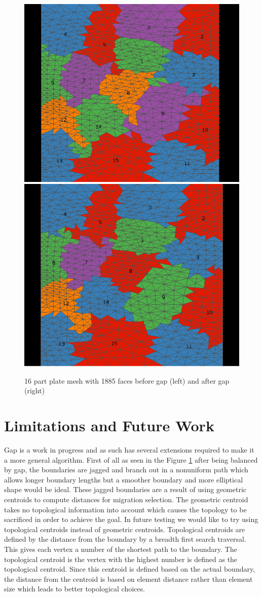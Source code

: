 \documentclass{thesis}
\begin{document}
\begin{figure} [!h]
\centering
\captionsetup{justification=centering,margin=1cm}
\includegraphics[width=.4\textwidth]{before_1885.png}
\includegraphics[width=.4\textwidth]{after_1885.png}
\caption{\label{fig:gap3} \textnormal{16 part plate mesh with 1885 faces before gap (left) and after gap (right)}}
\end{figure}


\chapter{Limitations and Future Work} 


Gap is a work in progress and as such has several extensions required to make 
it a more general algorithm. First of all as seen in the Figure \ref{fig:gap3} 
after being balanced by gap, the boundaries are jagged and branch out in a 
nonuniform path which allows longer boundary lengths but a smoother boundary 
and more elliptical shape would be ideal.  These jagged boundaries are a 
result of using geometric centroids to compute distances for migration 
selection. The geometric centroid takes no topological information into account 
which causes the topology to be sacrificed in order to achieve the goal. In 
future testing we would like to try using topological centroids instead of 
geometric centroids. Topological centroids are defined by the distance from the 
boundary by a breadth first search traversal. This gives each vertex a number 
of the shortest path to the boundary. The topological centroid is the vertex 
with the highest number is defined as the topological centroid. Since this 
centroid is defined based on the actual boundary, the distance from the 
centroid is based on element distance rather than element size which leads to 
better topological choices.
\end{document}
